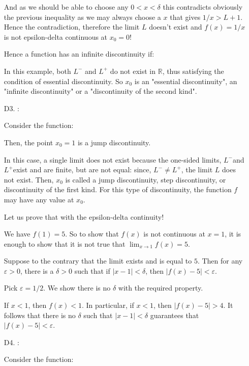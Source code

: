 \begin{itemize}
		And as we should be able to choose any $0<x<\delta$ this contradicts obviously the previous inequality as we may always choose a $x$ that gives $1/x>L+1$. Hence the contradiction, therefore the limit $L$ doesn't exist and $f(x)=1/x$ is not epsilon-delta continuous at $x_0=0$!

		Hence a function has an infinite discontinuity if:
		
		In this example, both $L^{-}$ and $L^{+}$ do not exist in $\mathbb{R}$, thus satisfying the condition of essential discontinuity. So $x_0$ is an "essential discontinuity", an "infinite discontinuity" or a "discontinuity of the second kind".
		
		\item[D3.] \label{Jump discontinuity}:

		Consider the function:
		
		Then, the point $x_0=1$ is a jump discontinuity.
	
		In this case, a single limit does not exist because the one-sided limits, $L^{-}$and $L^{+}$exist and are finite, but are not equal: since, $L^{-} \neq L^{+}$, the limit $L$ does not exist. Then, $x_0$ is called a jump discontinuity, step discontinuity, or discontinuity of the first kind. For this type of discontinuity, the function $f$ may have any value at $x_0$.
		
		Let us prove that with the epsilon-delta continuity! 
		
		We have $f(1)=5$. So to show that $f(x)$ is not continuous at $x=1$, it is enough to show that it is not true that $\lim _{x \rightarrow 1} f(x)=5$.

		Suppose to the contrary that the limit exists and is equal to $5$. Then for any $\varepsilon>0$, there is a $\delta>0$ such that if $|x-1|<\delta$, then $|f(x)-5|<\varepsilon$.
		
		Pick $\varepsilon=1/2$. We show there is no $\delta$ with the required property. 
		
		If $x<1$, then $f(x)<1$. In particular, if $x<1$, then $|f(x)-5|>4$. It follows that there is no $\delta$ such that $|x-1|<\delta$ guarantees that $|f(x)-5|<\varepsilon$.
	
		\item[D4.] \label{oscillating discontinuity}:
		
		Consider the function:
		

\end{itemize}
